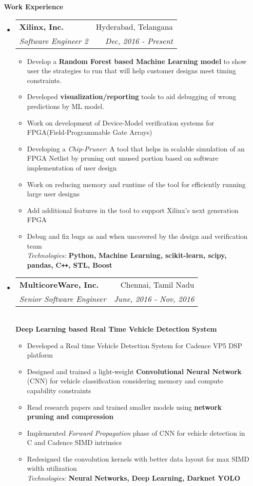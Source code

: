 \documentclass[letterpaper,11pt]{article}
\makeatletter
\newcommand{\resitem}[1]{\item #1 \vspace{-2pt}}
\newcommand{\resheading}[1]{{\large \colorbox{mygrey}{\begin{minipage}{\textwidth}{\textbf{#1 \vphantom{p\^{E}}}}\end{minipage}}}}
\newcommand{\ressubheading}[4]{
\begin{tabular*}{7.0in}{l@{\extracolsep{\fill}}r}
		\textbf{#1} & #2 \\
		\textit{#3} & \textit{#4} \\
\end{tabular*}\vspace{-6pt}}
\makeatother
\begin{document}
\resheading{Work Experience}
\begin{itemize}
\item
	\ressubheading{Xilinx, Inc.}{Hyderabad, Telangana}{Software Engineer 2}{Dec, 2016 - Present}
	\begin{itemize}
		\resitem{Develop a \textbf{Random Forest based Machine Learning model} to show user the strategies to run that will help customer designs meet timing constraints.}
		\resitem{Developed \textbf{visualization/reporting} tools to aid debugging of wrong predictions by ML model.}
		\resitem{Work on development of Device-Model verification systems for {\sc FPGA}(Field-Programmable Gate Arrays)}
		\resitem{Developing a \textit{Chip-Pruner}: A tool that helps in scalable simulation of an {\sc FPGA} Netlist by pruning out unused portion based on software implementation of user design}
		\resitem{Work on reducing memory and runtime of the tool for efficiently running large user designs}
		\resitem{Add additional features in the tool to support Xilinx’s next generation {\sc FPGA}}
		\resitem{Debug and fix bugs as and when uncovered by the design and verification team}
		\vspace*{5px}
		\\\textit{Technologies:} \cprotect\textbf{Python, Machine Learning, scikit-learn, scipy, pandas, C{}\verb!++!, STL, Boost}
	\end{itemize}
\item
	\ressubheading{MulticoreWare, Inc.}{Chennai, Tamil Nadu}{Senior Software Engineer}{June, 2016 - Nov, 2016}
	\vspace*{10px}
	\\\textbf{\quad Deep Learning based Real Time Vehicle Detection System}
	\begin{itemize}
		\vspace*{-5px}
		\resitem{Developed a Real time Vehicle Detection System for Cadence VP5 DSP platform}
		\resitem{Designed and trained a light-weight \textbf{Convolutional Neural Network} (CNN) for vehicle classification considering memory and compute capability constraints}
		\resitem{Read research papers and trained smaller models using \textbf{network pruning and compression}}
		\resitem{Implemented \textit{Forward Propagation} phase of CNN for vehicle detection in C and Cadence SIMD intrinsics}
		\resitem{Redesigned the convolution kernels with better data layout for max SIMD width utilization}
		\vspace*{5px}
		\\\textit{Technologies:} \textbf{Neural Networks, Deep Learning, Darknet YOLO}

\end{itemize}
\end{itemize}
\end{document}
